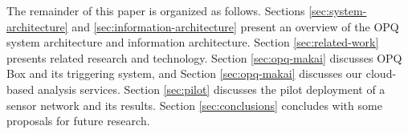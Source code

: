The remainder of this paper is organized as follows. Sections \ref{sec:system-architecture} and \ref{sec:information-architecture} present an overview of the OPQ system architecture and information architecture. Section \ref{sec:related-work} presents related research and technology.  Section \ref{sec:opq-makai} discusses OPQ Box and its triggering system, and Section \ref{sec:opq-makai} discusses our cloud-based analysis services. Section \ref{sec:pilot} discusses the pilot deployment of a sensor network and its results. Section \ref{sec:conclusions} concludes with some proposals for future research.



